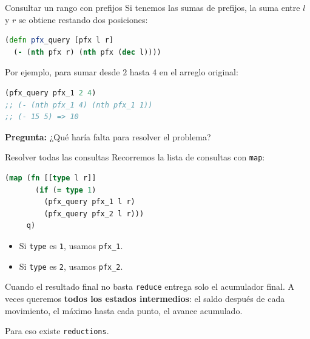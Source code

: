 \documentclass{beamer}
\begin{document}
\begin{frame}[fragile]{Consultar un rango con prefijos}
    Si tenemos las sumas de prefijos, la suma entre $l$ y $r$ se obtiene restando dos posiciones:

    \begin{lstlisting}[language=Clojure]
(defn pfx_query [pfx l r]
  (- (nth pfx r) (nth pfx (dec l))))
    \end{lstlisting}

    \vspace{0.2cm}
    Por ejemplo, para sumar desde $2$ hasta $4$ en el arreglo original:

    \begin{lstlisting}[language=Clojure]
(pfx_query pfx_1 2 4)
;; (- (nth pfx_1 4) (nth pfx_1 1))
;; (- 15 5) => 10
    \end{lstlisting}

    \textbf{Pregunta:} ¿Qué haría falta para resolver el problema?
    
\end{frame}

\begin{frame}[fragile]{Resolver todas las consultas}
    Recorremos la lista de consultas con \texttt{map}:

    \begin{lstlisting}[language=Clojure]
(map (fn [[type l r]]
       (if (= type 1)
         (pfx_query pfx_1 l r)
         (pfx_query pfx_2 l r)))
     q)
    \end{lstlisting}

    \begin{itemize}
        \item Si \texttt{type} es \texttt{1}, usamos \texttt{pfx\_1}.
        \item Si \texttt{type} es \texttt{2}, usamos \texttt{pfx\_2}.
    \end{itemize}
\end{frame}


\begin{frame}[fragile]{Cuando el resultado final no basta}
    \texttt{reduce} entrega solo el acumulador final. A veces queremos \textbf{todos los estados intermedios}: el saldo después de cada movimiento, el máximo hasta cada punto, el avance acumulado.

    \vspace{0.3cm}
    Para eso existe \texttt{reductions}.
\end{frame}
\end{document}
